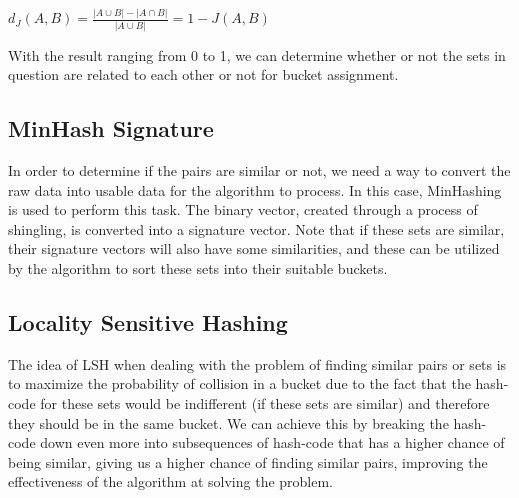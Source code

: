 \documentclass{article}
\begin{document}
$d_J(A,B) = \frac{|A \cup B| - |A \cap B|}{|A \cup B|} = 1 - J(A,B)
$

With the result ranging from 0 to 1, we can determine whether or not the sets in question are related to each other or not for bucket assignment.

\subsection{MinHash Signature}
In order to determine if the pairs are similar or not, we need a way to convert the raw data into usable data for the algorithm to process. In this case, MinHashing is used to perform this task. The binary vector, created through a process of shingling, is converted into a signature vector. Note that if these sets are similar, their signature vectors will also have some similarities, and these can be utilized by the algorithm to sort these sets into their suitable buckets.

\subsection{Locality Sensitive Hashing}
The idea of LSH when dealing with the problem of finding similar pairs or sets is to maximize the probability of collision in a bucket due to the fact that the hash-code for these sets would be indifferent (if these sets are similar) and therefore they should be in the same bucket. We can achieve this by breaking the hash-code down even more into subsequences of hash-code that has a higher chance of being similar, giving us a higher chance of finding similar pairs, improving the effectiveness of the algorithm at solving the problem.
\end{document}
